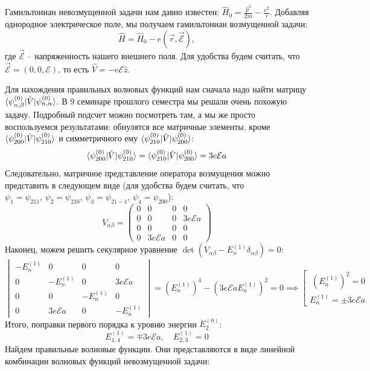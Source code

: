 Гамильтониан невозмущенной задачи нам давно известен: $\hat{H}_0 =
  \frac{\hat{p}^2}{2m}-\frac{e^2}{r}$. Добавляя однородное электрическое поле, мы
получаем гамильтониан возмущенной задачи:
\[
  \hat{H} = \hat{H}_0 - e(\Vec{r}, \Vec{\mathcal{E}}),
\]где $\Vec{\mathcal{E}}$ -- напряженность нашего внешнего поля. Для удобства
будем считать, что $\Vec{\mathcal{E}}=(0, 0, \mathcal{E})$, то есть $\hat{V} =
  -e\mathcal{E}\hat{z}$.

Для нахождения правильных волновых функций нам сначала надо найти матрицу
$\langle\psi^{(0)}_{n, \beta}\rvert \hat{V} \lvert\psi^{(0)}_{n, \alpha}\rangle$. В $9$
семинаре прошлого семестра мы решали очень похожую задачу. Подробный подсчет
можно посмотреть там, а мы же просто воспользуемся результатами: обнулятся все
матричные элементы, кроме $\langle\psi^{(0)}_{200}\rvert \hat{V}
  \lvert\psi^{(0)}_{210}\rangle$ и симметричного ему $\langle\psi^{(0)}_{210}\rvert \hat{V}
  \lvert\psi^{(0)}_{200}\rangle$:
\[
  \langle\psi^{(0)}_{200}\rvert \hat{V} \lvert\psi^{(0)}_{210}\rangle=\langle\psi^{(0)}_{210}\rvert \hat{V} \lvert\psi^{(0)}_{200}\rangle=3e\mathcal{E}a
\]
Следовательно, матричное представление оператора возмущения можно представить в
следующем виде (для удобства будем считать, что $\psi_1=\psi_{211}, \,
  \psi_2=\psi_{210}, \, \psi_3=\psi_{21-1}, \, \psi_4=\psi_{200}$):
\[V_{\alpha\beta}=
  \begin{pmatrix}
    0 & 0 & 0 & 0 \\ 0 & 0 & 0 & 3e\mathcal{E}a \\  0 & 0 & 0 & 0 \\ 0 & 3e\mathcal{E}a & 0 & 0
  \end{pmatrix}
\]
Наконец, можем решить секулярное уравнение
$\det(V_{\alpha\beta}-E_n^{(1)}\delta_{\alpha\beta}) = 0$:
\[
  \begin{vmatrix}
    -E_n^{(1)} & 0 & 0 & 0 \\ 0 & -E_n^{(1)} & 0 & 3e\mathcal{E}a \\  0 & 0 & -E_n^{(1)} & 0 \\ 0 & 3e\mathcal{E}a & 0 & -E_n^{(1)}
  \end{vmatrix}=(E_n^{(1)})^{4} -(3e\mathcal{E}aE_n^{(1)})^2 =0 \implies \left[\begin{matrix}\
    (E_n^{(1)})^{2} = 0 \\ E_n^{(1)} = \pm3e\mathcal{E}a
  \end{matrix}\right.
\]
Итого, поправки первого порядка к уровню энергии $E_2^{(0)}$:
\[
  E_{1,4}^{(1)}=\mp3e\mathcal{E}a, \quad E_{2,3}^{(1)}=0
\]
Найдем правильные волновые функции. Они представляются в виде линейной
комбинации волновых функций невозмущенной задачи:
